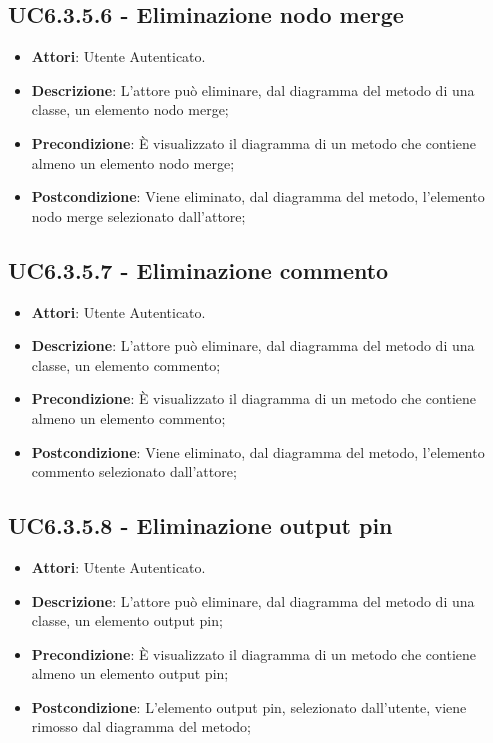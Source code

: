 \subsection{UC6.3.5.6 - Eliminazione nodo merge} 
\label{ssec:UC6.3.5.6} 
\begin{itemize} 
\item \textbf{Attori}: Utente Autenticato.
\item \textbf{Descrizione}: L'attore può eliminare, dal diagramma del metodo di una classe, un elemento nodo merge;
\item \textbf{Precondizione}: È visualizzato il diagramma di un metodo che contiene almeno un elemento nodo merge;
\item \textbf{Postcondizione}: Viene eliminato, dal diagramma del metodo,  l'elemento nodo merge selezionato dall'attore;
\end{itemize} 
\subsection{UC6.3.5.7 - Eliminazione commento} 
\label{ssec:UC6.3.5.7} 
\begin{itemize} 
\item \textbf{Attori}: Utente Autenticato.
\item \textbf{Descrizione}: L'attore può eliminare, dal diagramma del metodo di una classe, un elemento commento;
\item \textbf{Precondizione}: È visualizzato il diagramma di un metodo che contiene almeno un elemento commento;
\item \textbf{Postcondizione}: Viene eliminato, dal diagramma del metodo,  l'elemento commento selezionato dall'attore;
\end{itemize} 
\subsection{UC6.3.5.8 - Eliminazione output pin} 
\label{ssec:UC6.3.5.8} 
\begin{itemize} 
\item \textbf{Attori}: Utente Autenticato.
\item \textbf{Descrizione}: L'attore può eliminare, dal diagramma del metodo di una classe, un elemento output pin;
\item \textbf{Precondizione}: È visualizzato il diagramma di un metodo che contiene almeno un elemento output pin;
\item \textbf{Postcondizione}: L'elemento output pin, selezionato dall'utente, viene rimosso dal diagramma del metodo;
\end{itemize} 
